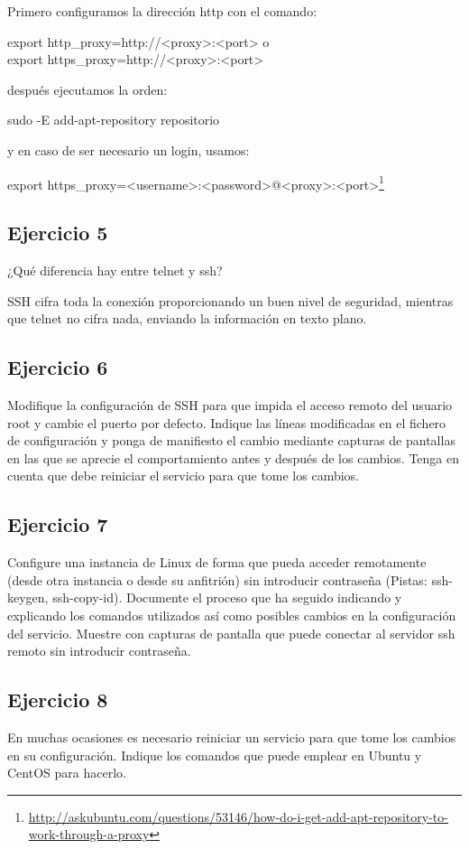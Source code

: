 \documentclass[a4paper, 11pt]{article} %
\begin{document}
Primero configuramos la dirección http con el comando: 

export http\_proxy=http://<proxy>:<port>   o \\
export https\_proxy=http://<proxy>:<port>

después ejecutamos la orden: 

sudo -E add-apt-repository repositorio

y en caso de ser necesario un login, usamos: 

export https\_proxy=<username>:<password>@<proxy>:<port>\footnote{\url{http://askubuntu.com/questions/53146/how-do-i-get-add-apt-repository-to-work-through-a-proxy}}

\subsection{Ejercicio 5}
¿Qué diferencia hay entre telnet y ssh?

SSH cifra toda la conexión proporcionando un buen nivel de seguridad, mientras que telnet no cifra nada, enviando la información en texto plano.


\subsection{Ejercicio 6}
Modifique la configuración de SSH para que impida el acceso remoto del usuario root y cambie el puerto por defecto. Indique las líneas modificadas en el fichero de configuración y ponga de manifiesto el cambio mediante capturas de pantallas en las que se aprecie el comportamiento antes y después de los cambios. Tenga en cuenta que debe reiniciar el servicio para que tome los cambios.


\subsection{Ejercicio 7}
Configure una instancia de Linux de forma que pueda acceder
remotamente (desde otra instancia o desde su anfitrión) sin introducir contraseña
(Pistas: ssh-keygen, ssh-copy-id). Documente el proceso que ha seguido indicando y
explicando los comandos utilizados así como posibles cambios en la configuración del
servicio. Muestre con capturas de pantalla que puede conectar al servidor ssh remoto
sin introducir contraseña.


\subsection{Ejercicio 8}
En muchas ocasiones es necesario reiniciar un servicio para que tome los
cambios en su configuración. Indique los comandos que puede emplear en Ubuntu y
CentOS para hacerlo.
\end{document}
